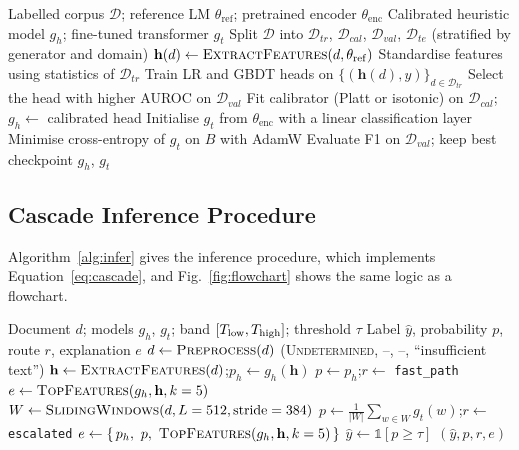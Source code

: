 \begin{algorithm}[H]
\caption{Training the VeriScript components}
\label{alg:train}
\begin{algorithmic}[1]
\Require Labelled corpus $\mathcal{D}$; reference LM $\theta_{\mathrm{ref}}$; pretrained encoder $\theta_{\mathrm{enc}}$
\Ensure Calibrated heuristic model $g_h$; fine-tuned transformer $g_t$
\State Split $\mathcal{D}$ into $\mathcal{D}_{tr}$, $\mathcal{D}_{cal}$, $\mathcal{D}_{val}$, $\mathcal{D}_{te}$ (stratified by generator and domain)
   \State $\mathbf{h}(d) \gets \Call{ExtractFeatures}{d,\theta_{\mathrm{ref}}}$ 
\EndFor
\State Standardise features using statistics of $\mathcal{D}_{tr}$
\State Train LR and GBDT heads on $\{(\mathbf{h}(d),y)\}_{d\in\mathcal{D}_{tr}}$
\State Select the head with higher AUROC on $\mathcal{D}_{val}$
\State Fit calibrator (Platt or isotonic) on $\mathcal{D}_{cal}$; $g_h \gets$ calibrated head
\State Initialise $g_t$ from $\theta_{\mathrm{enc}}$ with a linear classification layer
      \State Minimise cross-entropy of $g_t$ on $B$ with AdamW
   \EndFor
   \State Evaluate F1 on $\mathcal{D}_{val}$; keep best checkpoint
\EndFor
\State \Return $g_h$, $g_t$
\end{algorithmic}
\end{algorithm}

\subsection{Cascade Inference Procedure}

Algorithm~\ref{alg:infer} gives the inference procedure, which implements
Equation~\eqref{eq:cascade}, and Fig.~\ref{fig:flowchart} shows the same
logic as a flowchart.

\begin{algorithm}[H]
\caption{Confidence-gated cascade inference}
\label{alg:infer}
\begin{algorithmic}[1]
\Require Document $d$; models $g_h$, $g_t$; band $[T_{\mathrm{low}},T_{\mathrm{high}}]$; threshold $\tau$
\Ensure Label $\hat{y}$, probability $p$, route $r$, explanation $e$
\State $d \gets \Call{Preprocess}{d}$
   \State \Return (\textsc{Undetermined}, --, --, ``insufficient text'')
\EndIf
\State $\mathbf{h} \gets \Call{ExtractFeatures}{d}$;\quad $p_h \gets g_h(\mathbf{h})$
   \State $p \gets p_h$;\quad $r \gets$ \texttt{fast\_path}
   \State $e \gets \Call{TopFeatures}{g_h,\mathbf{h},k=5}$
\Else
   \State $W \gets \Call{SlidingWindows}{d, L=512, \text{stride}=384}$
   \State $p \gets \frac{1}{|W|}\sum_{w\in W} g_t(w)$;\quad $r \gets$ \texttt{escalated}
   \State $e \gets \{\,p_h,\ p,\ \Call{TopFeatures}{g_h,\mathbf{h},k=5}\,\}$
\EndIf
\State $\hat{y} \gets \mathbb{1}[p \ge \tau]$
\State \Return $(\hat{y}, p, r, e)$
\end{algorithmic}
\end{algorithm}

